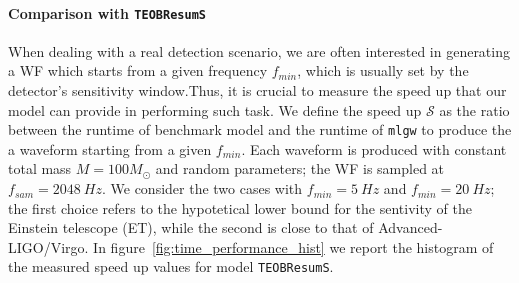 \paragraph{Comparison with \texttt{TEOBResumS}}
When dealing with a real detection scenario, we are often interested in generating a WF which starts from a given frequency $f_{min}$, which is usually set by the detector's sensitivity window.Thus, it is crucial to measure the speed up that our model can provide in performing such task.
We define the speed up $\mathcal{S}$ as the ratio between the runtime of benchmark model and the runtime of \texttt{mlgw} to produce the a waveform starting from a given $f_{min}$. Each waveform is produced with constant total mass $M = 100 M_{\odot}$ and random parameters; the WF is sampled at $f_{sam} = \SI{2048}{Hz}$.
We consider the two cases with $f_{min} = \SI{5}{Hz}$ and $f_{min} = \SI{20}{Hz}$; the first choice refers to the hypotetical lower bound for the sentivity of the Einstein telescope (ET), while the second is close to that of Advanced-LIGO/Virgo.
In figure~\ref{fig:time_performance_hist} we report the histogram of the measured speed up values for model \texttt{TEOBResumS}.

